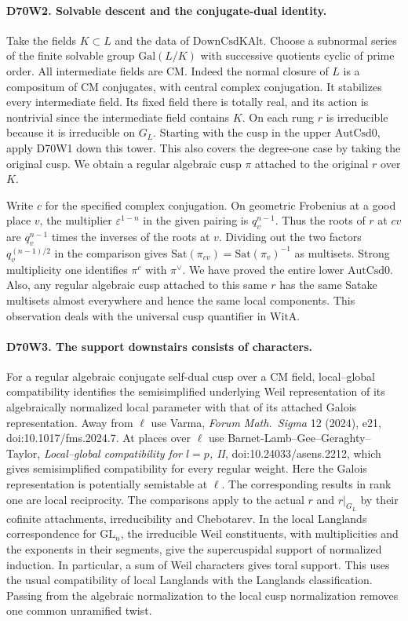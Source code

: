 \paragraph{D70W2. Solvable descent and the conjugate-dual identity.}
Take the fields $K\subset L$ and the data of $\mathrm{DownCsdKAlt}$.
Choose a subnormal series of the finite solvable group
$\mathrm{Gal}(L/K)$ with successive quotients cyclic of prime order.
All intermediate fields are CM. Indeed the normal closure of $L$ is
a compositum of CM conjugates, with central complex conjugation.
It stabilizes every intermediate field. Its fixed field there is
totally real, and its action is nontrivial since the intermediate
field contains $K$. On each rung $r$ is irreducible because it is
irreducible on $G_L$. Starting with the cusp in the upper
$\mathrm{AutCsd0}$, apply D70W1 down this tower. This also covers the
degree-one case by taking the original cusp. We obtain a regular
algebraic cusp $\pi$ attached to the original $r$ over $K$.

Write $c$ for the specified complex conjugation. On geometric
Frobenius at a good place $v$, the multiplier
$\varepsilon^{1-n}$ in the given pairing is $q_v^{n-1}$.
Thus the roots of $r$ at $c v$ are $q_v^{n-1}$ times the inverses
of the roots at $v$. Dividing out the two factors
$q_v^{(n-1)/2}$ in the comparison gives
$\mathrm{Sat}(\pi_{cv})=\mathrm{Sat}(\pi_v)^{-1}$ as multisets.
Strong multiplicity one identifies $\pi^c$ with $\pi^\vee$.
We have proved the entire lower $\mathrm{AutCsd0}$. Also, any
regular algebraic cusp attached to this same $r$ has the same Satake
multisets almost everywhere and hence the same local components.
This observation deals with the universal cusp quantifier in
$\mathrm{WitA}$.

\paragraph{D70W3. The support downstairs consists of characters.}
For a regular algebraic conjugate self-dual cusp over a CM field,
local--global compatibility identifies the semisimplified underlying
Weil representation of its algebraically normalized local parameter
with that of its attached Galois representation. Away from $\ell$
use Varma, \emph{Forum Math.\ Sigma} 12 (2024), e21,
doi:10.1017/fms.2024.7. At places over $\ell$ use
Barnet-Lamb--Gee--Geraghty--Taylor, \emph{Local--global
compatibility for $l=p$, II}, doi:10.24033/asens.2212, which gives
semisimplified compatibility for every regular weight. Here the
Galois representation is potentially semistable at $\ell$.
The corresponding results in rank one are local reciprocity.
The comparisons apply to the actual $r$ and $r|_{G_L}$ by their
cofinite attachments, irreducibility and Chebotarev. In the local
Langlands correspondence for $\mathrm{GL}_n$, the irreducible Weil
constituents, with multiplicities and the exponents in their
segments, give the supercuspidal support of normalized induction.
In particular, a sum of Weil characters gives toral support. This
uses the usual compatibility of local Langlands with the
Langlands classification. Passing from the algebraic normalization
to the local cusp normalization removes one common unramified twist.

